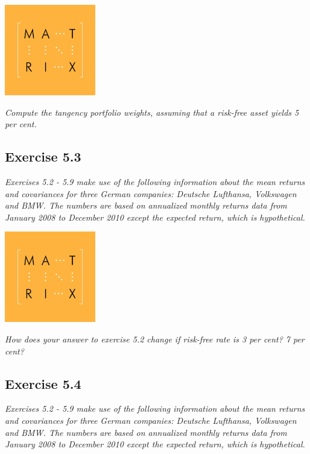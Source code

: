 \documentclass[]{book}
\theoremstyle{definition}
\theoremstyle{definition}
\theoremstyle{remark}
\begin{document}
\begin{center}\includegraphics[width=150px]{figures/matrix} \end{center}

\emph{Compute the tangency portfolio weights, assuming that a risk-free
asset yields 5 per cent.} \citep[p.160]{book}

\subsection{Exercise 5.3}\label{exercise-5.3}

\emph{Exercises 5.2 - 5.9 make use of the following information about
the mean returns and covariances for three German companies: Deutsche
Lufthansa, Volkswagen and BMW. The numbers are based on annualized
monthly returns data from January 2008 to December 2010 except the
expected return, which is hypothetical.} \citep[p.159]{book}

\begin{center}\includegraphics[width=150px]{figures/matrix} \end{center}

\emph{How does your answer to exercise 5.2 change if risk-free rate is 3
per cent? 7 per cent?} \citep[p.160]{book}

\subsection{Exercise 5.4}\label{exercise-5.4}

\emph{Exercises 5.2 - 5.9 make use of the following information about
the mean returns and covariances for three German companies: Deutsche
Lufthansa, Volkswagen and BMW. The numbers are based on annualized
monthly returns data from January 2008 to December 2010 except the
expected return, which is hypothetical.} \citep[p.159]{book}
\end{document}
